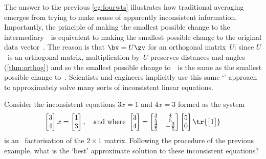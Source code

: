 The answer to the previous \autoref{eg:fourwts} illustrates how traditional averaging emerges from trying to make sense of apparently inconsistent information.
Importantly, the principle of making the smallest possible change to the intermediary~\zv\ is equivalent to making the smallest possible change to the original data vector~\bv.
The reason is that \(\bv=U\zv\) for an orthogonal matrix~\(U\): since \(U\)~is an orthogonal matrix, multiplication by~\(U\) preserves distances and angles (\autoref{thm:orthog}) and so the smallest possible change to~\bv\ is the same as the smallest possible change to~\zv.
Scientists and engineers implicitly use this same `' approach to approximately solve many sorts of inconsistent linear equations.




\begin{activity}
Consider the inconsistent equations \(3x=1\) and \(4x=3\) formed as the system
%
\begin{equation*}
\begin{bmatrix} 3\\4 \end{bmatrix}x=\begin{bmatrix} 1\\3 \end{bmatrix},
\quad\text{and where }
\begin{bmatrix} 3\\4 \end{bmatrix}
=\begin{bmatrix} \frac35&\frac45\\\frac45&-\frac35 \end{bmatrix}
\begin{bmatrix} 5\\0 \end{bmatrix}
\tr{\begin{bmatrix} 1 \end{bmatrix}}
\end{equation*}
is an \svd\ factorisation of the \(2\times 1\) matrix.
Following the procedure of the previous example, what is the `best' approximate solution to these inconsistent equations?
\end{activity}





